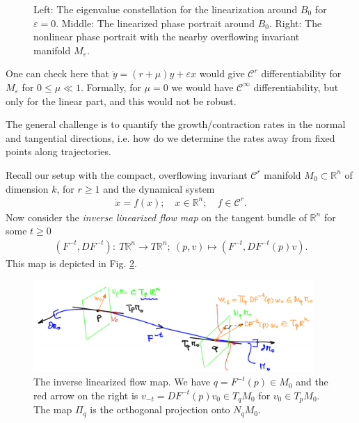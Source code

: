 \begin{ex}[]
\begin{figure}[h!]
		\caption{Left: The eigenvalue constellation for the linearization around $B_0$ for $\varepsilon=0$. Middle: The linearized phase portrait around $B_0$. Right: The nonlinear phase portrait with the nearby overflowing invariant manifold $M_{\varepsilon}$.}
		\label{fig:alpha_specification}
	\end{figure}
	One can check here that $\dot{y}= (r+\mu )y + \varepsilon x$ would give $\mathcal{C}^{r}$ differentiability for $M_{\varepsilon}$ for $0 \leq \mu \ll 1$. Formally, for $\mu=0 $ we would have $\mathcal{C}^{\infty }$ differentiability, but only for the linear part, and this would not be robust.	
\end{ex}

The general challenge is to quantify the growth/contraction rates in the normal and tangential directions, i.e. how do we determine the rates away from fixed points along trajectories.

Recall our setup with the compact, overflowing invariant $\mathcal{C}^{r}$ manifold $M_0 \subset   \mathbb{R}^{n}$ of dimension $k$, for $r\geq 1$ and the dynamical system 
\begin{align}
	\dot{x} = f(x);\quad x \in \mathbb{R}^{n};\quad f\in \mathcal{C}^{r}.
\end{align}
Now consider the \emph{inverse linearized flow map} on the tangent bundle of $\mathbb{R}^{n}$ for some $t\geq 0$
\begin{align}
	(F^{-t}, DF^{-t}):\ T\mathbb{R}^{n} \to T\mathbb{R}^{n};\ (p,v) \mapsto \left(F^{-t}, DF^{-t}(p)v\right).
\end{align}
This map is depicted in Fig. \ref{fig:inv_lin_flow_map}.
\begin{figure}[h!]
	\centering
	\includegraphics[width=0.95\textwidth]{figures/ch9/13inv_lin_flow_map.png}
	\caption{The inverse linearized flow map. We have $q=F^{-t}(p)\in M_0$ and the red arrow on the right is $v_{-t}=DF^{-t}(p)v_0 \in T_{q}M_0$ for $v_0 \in T_{p}M_0$. The map $\Pi_{q}$ is the orthogonal projection onto $N_{q}M_0$.}
	\label{fig:inv_lin_flow_map}
\end{figure}

